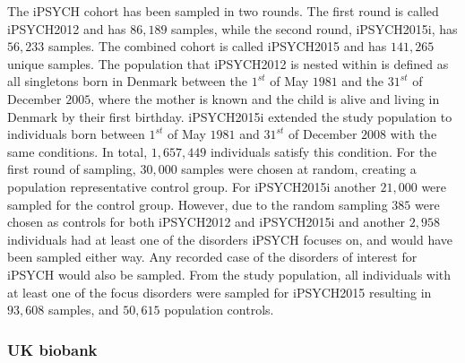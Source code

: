 The iPSYCH cohort has been sampled in two rounds. The first round is called iPSYCH2012 and has $ 86,189 $ samples, while the second round, iPSYCH2015i, has $ 56,233 $ samples. The combined cohort is called iPSYCH2015 and has $ 141,265 $ unique samples. The population that iPSYCH2012 is nested within is defined as all singletons born in Denmark between the $ 1^{st} $ of May $ 1981 $ and the $ 31^{st} $ of December $ 2005 $, where the mother is known and the child is alive and living in Denmark by their first birthday. iPSYCH2015i extended the study population to individuals born between $ 1^{st} $ of May $ 1981 $ and $ 31^{st} $ of December $ 2008 $ with the same conditions. In total, $ 1,657,449 $ individuals satisfy this condition. For the first round of sampling, $ 30,000 $ samples were chosen at random, creating a population representative control group. For iPSYCH2015i another $ 21,000 $ were sampled for the control group. However, due to the random sampling $ 385 $ were chosen as controls for both iPSYCH2012 and iPSYCH2015i and another $ 2,958 $ individuals had at least one of the disorders iPSYCH focuses on, and would have been sampled either way. Any recorded case of the disorders of interest for iPSYCH would also be sampled. From the study population, all individuals with at least one of the focus disorders were sampled for iPSYCH2015 resulting in $ 93,608 $ samples, and $ 50,615 $ population controls\cite{pedersen2018ipsych2012,bybjerg2020ipsych2015}.

\subsubsection{UK biobank}

